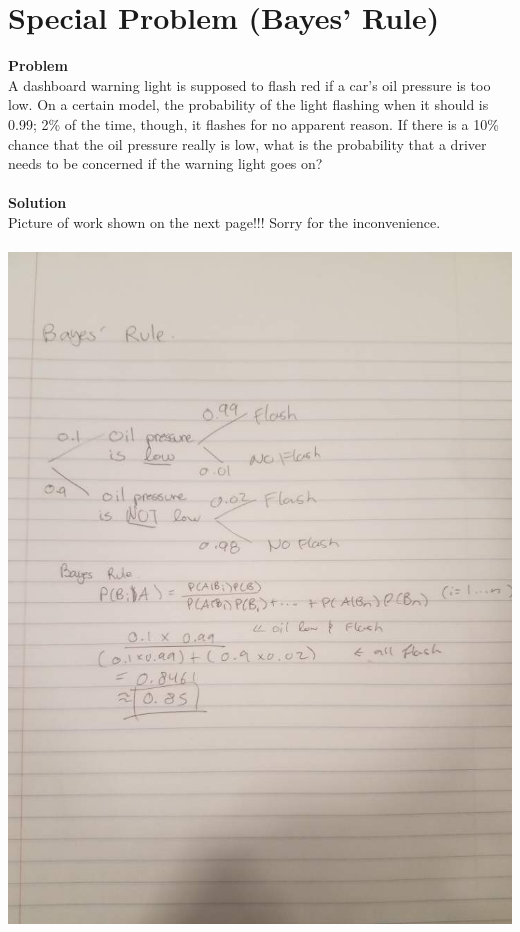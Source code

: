 \documentclass[10pt]{report}
\begin{document}
\section{\sc\color{cit}Special Problem (Bayes' Rule)}
\textbf{Problem} \\
A dashboard warning light is supposed to flash red if a car’s oil pressure is too low. On a certain model, the probability of the light flashing when it should is 0.99; 2\% of the time, though, it flashes for no apparent reason. If there is a 10\% chance that the oil pressure really is low, what is the probability that a driver needs to be concerned if the warning light goes on? \ \\
\ \\
\textbf{Solution} \\
Picture of work shown on the next page!!! Sorry for the inconvenience.\\\
\includegraphics[scale=0.5]{bayes.jpeg}
\end{document}
